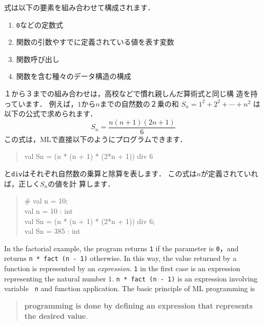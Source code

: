 \documentclass{jbook}
\newenvironment{program}{\begin{quote}\begin{tt}}%
                        {\end{tt}\end{quote}}
\begin{document}
	式は以下の要素を組み合わせて構成されます．
\begin{enumerate}
\item {\tt 0}などの定数式
\item 関数の引数やすでに定義されている値を表す変数
\item 関数呼び出し
\item 関数を含む種々のデータ構造の構成
\end{enumerate}
	１から３までの組み合わせは，高校などで慣れ親しんだ算術式と同じ構
造を持っています．
	例えば，$1$から$n$までの自然数の２乗の和
$S_n = 1^2 + 2^2 + \cdots + n^2$
は以下の公式で求められます．
\[
S_n = \frac{n (n + 1) (2n + 1)}{6}
\]
この式は，MLで直接以下のようにプログラムできます．
\begin{program}
val Sn = (n * (n + 1) * (2*n + 1)) div 6
\end{program}
	{\tt *}と{\tt div}はそれぞれ自然数の乗算と除算を表します．
	この式は$n$が定義されていれば，正しく$S_n$の値を計
算します．
\begin{program}
\# val n = 10;\\
val n = 10 : int\\
val Sn = (n * (n + 1) * (2*n + 1)) div 6;\\
val Sn = 385 : int
\end{program}

\else%
	In the factorial example, the program returns {\tt 1} 
if the parameter is {\tt 0}，and returns {\tt n * fact (n - 1)}
otherwise.
	In this way, the value returned by a function is represented by
an {\em expression}.
	{\tt 1} in the first case is an expression representing the
natural number $1$.
	{\tt n * fact (n - 1)} is an expression involving variable {\tt
n} and function application.
	The basic principle of ML programming is 
\begin{quote}
{\bf programming is done by defining an expression that represents the desired value}.
\end{quote}
\end{document}
